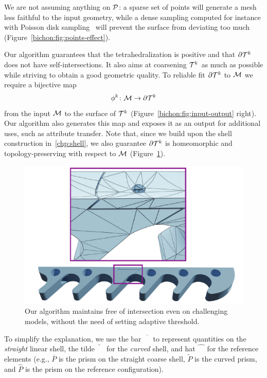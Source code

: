 We are not assuming anything on $\P$: a sparse set of points will generate a mesh less faithful to the input geometry, while a dense sampling computed for instance with Poisson disk sampling~\cite{bowers2010parallel} will prevent the surface from deviating too much (Figure~\ref{bichon:fig:points-effect}).


Our algorithm guarantees that the tetrahedralization is positive and that $\partial\T^k$ does not have self-intersections. 
It also aims at coarsening {$\T^k$} as much as possible while striving to obtain a good geometric quality. 
To reliable fit $\partial \T^k$ to $\M$ we require a bijective map
\[
\phi^k \colon \M \to \partial \T^k
\]
from the input $\M$ to the surface of $\T^k$ (Figure~\ref{bichon:fig:input-output} right). Our algorithm also generates this map and exposes it as an output for additional uses, such as attribute transfer. Note that, since we build upon the shell construction in~\ref{chp:shell}, we also {guarantee} $\partial\T^k$ is homeomorphic and topology-preserving with respect to $\M$ (Figure~\ref{bichon:fig:intersection}).


\begin{figure}
    \centering
    \includegraphics[width=0.9\linewidth]{curve_meshing_in_shell_tex/figs/intersection-free.pdf}\hfill
    \caption{Our algorithm maintains {free of} intersection even on challenging models, without the need of setting adaptive threshold.}
    \label{bichon:fig:intersection}
\end{figure}




To simplify the explanation{,} we use the bar $\overline{\phantom{M}}$ to represent quantities on the \emph{straight} linear shell, the tilde $\widetilde{\phantom{M}}$ for the \emph{curved} shell, and hat $\hat{\phantom{M}}$ for the reference elements (e.g., $\overline P$ is the prism on {the} straight coarse shell, $\widetilde P$ is the curved prism, and $\hat P$ is the prism on the reference configuration).


